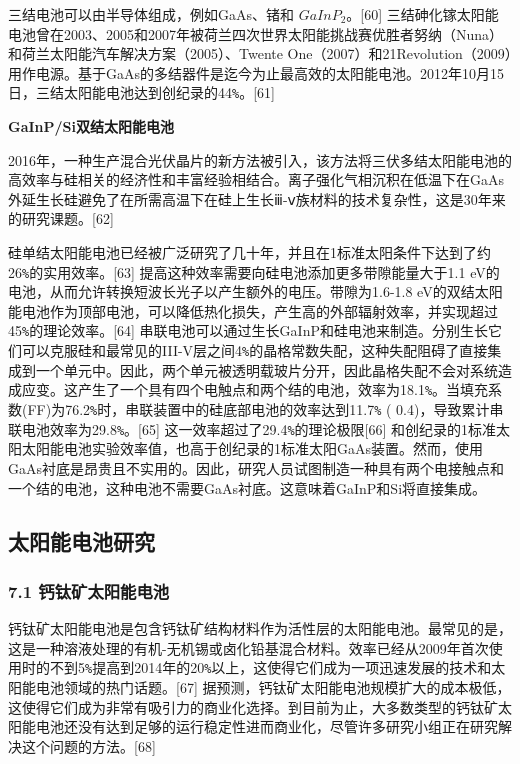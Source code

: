 三结电池可以由半导体组成，例如GaAs、锗和 $GaInP_2$。[60] 三结砷化镓太阳能电池曾在2003、2005和2007年被荷兰四次世界太阳能挑战赛优胜者努纳（Nuna）和荷兰太阳能汽车解决方案（2005）、Twente One（2007）和21Revolution（2009）用作电源。基于GaAs的多结器件是迄今为止最高效的太阳能电池。2012年10月15日，三结太阳能电池达到创纪录的44\verb|%|。[61]

\textbf{GaInP/Si双结太阳能电池}

2016年，一种生产混合光伏晶片的新方法被引入，该方法将三伏多结太阳能电池的高效率与硅相关的经济性和丰富经验相结合。离子强化气相沉积在低温下在GaAs外延生长硅避免了在所需高温下在硅上生长ⅲ-ⅴ族材料的技术复杂性，这是30年来的研究课题。[62]

硅单结太阳能电池已经被广泛研究了几十年，并且在1标准太阳条件下达到了约26\verb|%|的实用效率。[63] 提高这种效率需要向硅电池添加更多带隙能量大于1.1 eV的电池，从而允许转换短波长光子以产生额外的电压。带隙为1.6-1.8 eV的双结太阳能电池作为顶部电池，可以降低热化损失，产生高的外部辐射效率，并实现超过45\verb|%|的理论效率。[64] 串联电池可以通过生长GaInP和硅电池来制造。分别生长它们可以克服硅和最常见的III-V层之间4\verb|%|的晶格常数失配，这种失配阻碍了直接集成到一个单元中。因此，两个单元被透明载玻片分开，因此晶格失配不会对系统造成应变。这产生了一个具有四个电触点和两个结的电池，效率为18.1\verb|%|。当填充系数(FF)为76.2\verb|%|时，串联装置中的硅底部电池的效率达到11.7\verb|%| ( 0.4)，导致累计串联电池效率为29.8\verb|%|。[65] 这一效率超过了29.4\verb|%|的理论极限[66] 和创纪录的1标准太阳太阳能电池实验效率值，也高于创纪录的1标准太阳GaAs装置。然而，使用GaAs衬底是昂贵且不实用的。因此，研究人员试图制造一种具有两个电接触点和一个结的电池，这种电池不需要GaAs衬底。这意味着GaInP和Si将直接集成。

\subsection{太阳能电池研究}

\subsubsection{7.1 钙钛矿太阳能电池}

钙钛矿太阳能电池是包含钙钛矿结构材料作为活性层的太阳能电池。最常见的是，这是一种溶液处理的有机-无机锡或卤化铅基混合材料。效率已经从2009年首次使用时的不到5\verb|%|提高到2014年的20\verb|%|以上，这使得它们成为一项迅速发展的技术和太阳能电池领域的热门话题。[67] 据预测，钙钛矿太阳能电池规模扩大的成本极低，这使得它们成为非常有吸引力的商业化选择。到目前为止，大多数类型的钙钛矿太阳能电池还没有达到足够的运行稳定性进而商业化，尽管许多研究小组正在研究解决这个问题的方法。[68]

